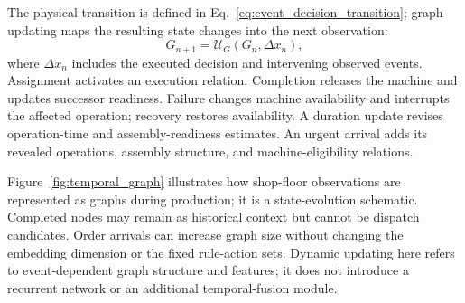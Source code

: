 

The physical transition is defined in Eq.~\eqref{eq:event_decision_transition}; graph updating maps
the resulting state changes into the next observation:
\begin{equation}
 G_{n+1}=\mathcal U_G(G_n,\Delta x_n),
 \label{eq:graph_update}
\end{equation}
where $\Delta x_n$ includes the executed decision and intervening observed events.
Assignment activates an execution relation. Completion releases the machine and updates successor readiness.
Failure changes machine availability and interrupts the affected operation; recovery restores availability.
A duration update revises operation-time and assembly-readiness estimates. An urgent arrival adds its revealed operations,
assembly structure, and machine-eligibility relations.


Figure~\ref{fig:temporal_graph} illustrates how shop-floor observations are represented as graphs during production; it is a state-evolution schematic. Completed nodes may
remain as historical context but cannot be dispatch candidates. Order arrivals can increase graph size
without changing the embedding dimension or the fixed rule-action sets. Dynamic updating here refers
to event-dependent graph structure and features; it does not introduce a recurrent network or
an additional temporal-fusion module.

